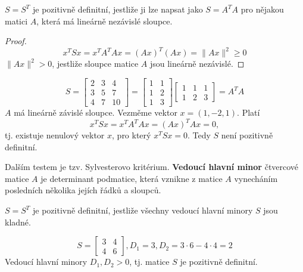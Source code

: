 \begin{vt2}\cite{linear-algebra-and-learning-from-data}
    $S = S^T$ je pozitivně definitní, jestliže ji lze napsat jako $S = A^T A$ pro nějakou matici $A$, která má lineárně nezávislé sloupce.
\end{vt2}
\begin{proof}
    $$
        x^TSx = x^TA^TAx = (Ax)^T(Ax) = \lVert Ax \rVert^2 \geq 0
    $$
    $\lVert Ax \rVert^2 > 0$, jestliže sloupce matice $A$ jsou lineárně nezávislé.
\end{proof}

\begin{pr}
    $$
        S = 
        \begin{bmatrix}
            2 & 3 & 4 \\
            3 & 5 & 7 \\
            4 & 7 & 10
        \end{bmatrix} =
        \begin{bmatrix}
            1 & 1 \\
            1 & 2 \\
            1 & 3
        \end{bmatrix}
        \begin{bmatrix}
            1 & 1 & 1 \\
            1 & 2 & 3
        \end{bmatrix} =
        A^TA
    $$
    $A$ má lineárně závislé sloupce. Vezměme vektor $x = (1, -2, 1)$. Platí
    $$
        x^TSx = x^T A^TA x = (Ax)^T Ax = 0,
    $$
    tj. existuje nenulový vektor $x$, pro který $x^TSx = 0$. Tedy $S$ není pozitivně definitní.
\end{pr}

Dalším testem je tzv. Sylvesterovo kritérium. \textbf{Vedoucí hlavní minor} čtvercové matice $A$ je determinant podmatice, která vznikne z matice $A$ vynecháním posledních několika jejích řádků a sloupců.

\begin{vt2}\cite{linear-algebra-and-learning-from-data}
    $S = S^T$ je pozitivně definitní, jestliže všechny vedoucí hlavní minory $S$ jsou kladné.
\end{vt2}

\begin{pr}
    $$  S =
        \begin{bmatrix}
            3 & 4 \\
            4 & 6
        \end{bmatrix},
        D_1 = 3,
        D_2 = 3 \cdot 6 - 4 \cdot 4 = 2 
    $$
    Vedoucí hlavní minory $D_1, D_2 > 0$, tj. matice $S$ je pozitivně definitní.
\end{pr}

